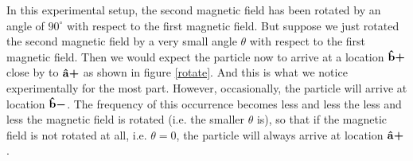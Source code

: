 \documentclass[letter, 12pt]{turabian-thesis}
\theoremstyle{hypothesis}
\newcommand{\uvb}[1]{\vb{\hat{{#1}}}}
\newcommand{\uvbp}[1]{\uvb{#1}\bm{+}}
\newcommand{\uvbm}[1]{\uvb{#1}\bm{-}}
\begin{document}
 In this experimental setup, the second magnetic field has been rotated by an angle of $90^\circ$ with respect to the first magnetic field. But suppose we just rotated the second magnetic field by a very small angle $\theta$ with respect to the first magnetic field. Then we would expect the particle now to arrive at a location  $\uvbp{b}$ close by to $\uvbp{a}$ as shown in figure \ref{rotate}. And this is what we notice experimentally for the most part. However, occasionally, the particle will arrive at location $\uvbm{b}$. The frequency of this occurrence becomes less and less the less and less the magnetic field is rotated (i.e. the smaller $\theta$ is), so that if the magnetic field is not rotated at all, i.e. $\theta=0$, the particle will always arrive at location $\uvbp{a}$. 
\end{document}

